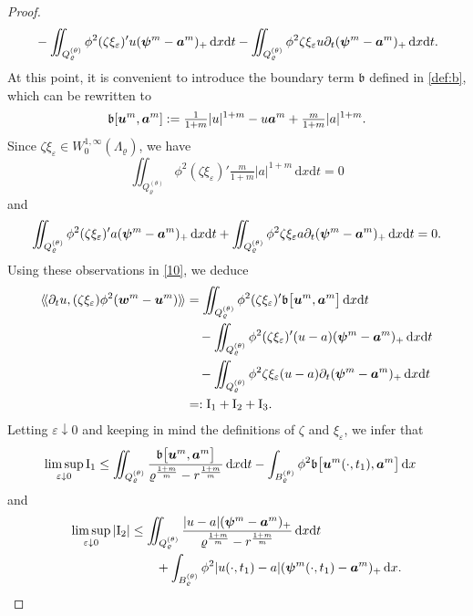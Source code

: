 \documentclass[a4paper, 10pt, american]{amsart}
\numberwithin{theorem}{section}
\numberwithin{equation}{section}
\newcommand{\dxdt}{\,\mathrm{d}x\mathrm{d}t}
\newcommand{\dx}{\,\mathrm{d}x}
\renewcommand{\epsilon}{\varepsilon}
\renewcommand{\epsilon}{\varepsilon}
\newcommand{\eps}{\varepsilon}
\renewcommand{\rho}{\varrho}
\newcommand{\power}[2]{\bm{#1^{\mbox{\unboldmath{\scriptsize$#2$}}}}}
\newcommand{\abs}[1]{|#1|}
\begin{document}
\begin{proof}
\begin{align}
& \quad - \iint_{Q_\rho^{(\theta)}} \phi^2 (\zeta\xi_\varepsilon)' u
(\power \psi m-\power am)_+ \dxdt
-
\iint_{Q_\rho^{(\theta)}}\phi^2 \zeta\xi_\varepsilon u \partial_t(\power \psi m-\power am)_+ \dxdt.
\end{align}
At this point, it is convenient to introduce the boundary term
$\mathfrak{b}$ defined in \eqref{def:b}, which can be rewritten to
\begin{equation*}
  \mathfrak b[\power{u}{m},\power{a}{m}]
  :=
  \tfrac1{1+m}|u|^{1+m} -u\power am +\tfrac{m}{1+m} \abs{a}^{1+m}.
\end{equation*}
Since $\zeta\xi_\varepsilon \in W^{1,\infty}_0(\Lambda_\rho)$, we have
$$\iint_{Q_\rho^{(\theta)}} \phi^2 (\zeta\xi_\varepsilon)' \tfrac{m}{1+m}|a|^{1+m} \dxdt =0$$
and
$$\iint_{Q_\rho^{(\theta)}} \phi^2 (\zeta\xi_\varepsilon)' a (\power \psi m-\power am)_+\dxdt + \iint_{Q_\rho^{(\theta)}}\phi^2 \zeta\xi_\varepsilon a \partial_t(\power \psi m-\power am)_+ \dxdt =0.$$
Using these observations in \eqref{10}, we deduce 
\begin{align}\label{11}
\nonumber \langle\!\langle\partial_tu,(\zeta\xi_\varepsilon)\phi^2(\power wm-\power um)\rangle\!\rangle 
&=\iint_{Q_\rho^{(\theta)}} \phi^2 (\zeta\xi_\varepsilon)' \mathfrak b\big[\power{u}{m}, \power{a}{m}\big] \dxdt  \\\nonumber
&\quad - \iint_{Q_\rho^{(\theta)}} \phi^2 (\zeta\xi_\varepsilon)' (u-a) (\power \psi m-\power am)_+ \dxdt \\\nonumber
&\quad - \iint_{Q_\rho^{(\theta)}}\phi^2 \zeta\xi_\varepsilon (u-a) \partial_t(\power \psi m-\power am)_+ \dxdt\\
&=:\mathrm{I}_1 +\mathrm{I}_2+\mathrm{I}_3.
\end{align}
Letting $\eps\downarrow0$ and keeping in mind the definitions of
$\zeta$ and $\xi_\eps$, we infer that 
\begin{align}\label{12}
\limsup_{\epsilon\downarrow0}\mathrm{I}_1 
&\leq 
	\iint_{Q_\rho^{(\theta)}} 
	\frac{\mathfrak b\big[\power{u}{m}, \power{a}{m}\big]}{\rho^{\frac{1+m}{m}}-r^{\frac{1+m}{m}}} \dxdt
-\int_{B_\rho^{(\theta)}} \phi^2  \mathfrak b\big[\power{u}{m}(\cdot,t_1), \power{a}{m}\big] \dx
\end{align}
and
\begin{align}\label{15-1}
\limsup_{\epsilon\downarrow0}|\mathrm{I}_2 |
&\le
\iint_{Q_\rho^{(\theta)}} 
\frac{|u-a|(\power \psi m - \power am)_+}{\rho^{\frac{1+m}{m}}-r^{\frac{1+m}{m}}} \dxdt \\\nonumber
&\quad\quad+\int_{B_\rho^{(\theta)}} \phi^2  |u(\cdot, t_1)-a|(\power \psi m(\cdot, t_1) - \power am)_+ \dx.

\end{align}
\end{proof}
\end{document}
